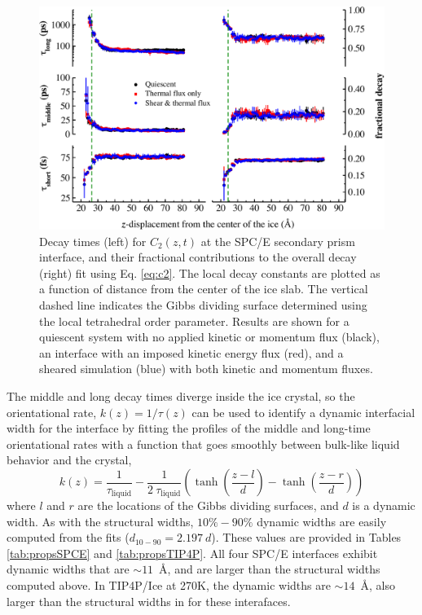 \newpage
\begin{figure}
\includegraphics[width=\linewidth]{Figures/Sec_lcorrz}
\caption{\label{fig:SPorient} Decay times (left) for $C_2(z,t)$ at the
  SPC/E secondary prism interface, and their fractional contributions to the
  overall decay (right) fit using Eq. \eqref{eq:c2}. The local decay
  constants are plotted as a function of distance from the center of
  the ice slab. The vertical dashed line indicates the Gibbs dividing
  surface determined using the local tetrahedral order parameter.
  Results are shown for a quiescent system with no applied kinetic or
  momentum flux (black), an interface with an imposed
  kinetic energy flux (red), and a sheared simulation (blue) with both
  kinetic and momentum fluxes.}
\end{figure}

The middle and long decay times diverge inside the ice crystal, so the
orientational rate, $k(z) = 1 / \tau(z)$ can be used to identify a
dynamic interfacial width for the interface by fitting the profiles of
the middle and long-time orientational rates with a function that goes
smoothly between bulk-like liquid behavior and the crystal,
\begin{equation}\label{tauFit}
  k(z) = \frac{1}{\tau_\mathrm{liquid}} - \frac{1}{2~\tau_\mathrm{liquid}} \left(
      \tanh \left( \frac{z-l}{d} \right) - \tanh \left( \frac{z-r}{d} \right) \right)
\end{equation}
where $l$ and $r$ are the locations of the Gibbs dividing surfaces,
and $d$ is a dynamic width.  As with the structural widths,
$10\%-90\%$ dynamic widths are easily computed from the fits
($d_\mathrm{10-90} = 2.197~d$).  These values are provided in Tables
\ref{tab:propsSPCE} and \ref{tab:propsTIP4P}. All four SPC/E
interfaces exhibit dynamic widths that are $\sim 11$~\AA, and are
larger than the structural widths computed above.  In TIP4P/Ice at
270K, the dynamic widths are $\sim 14$~\AA, also larger than the
structural widths in for these interafaces.

